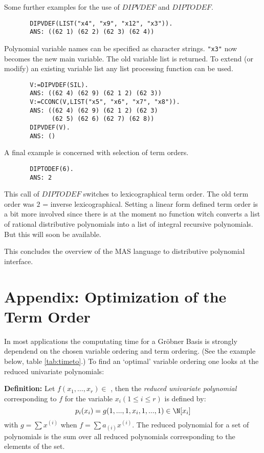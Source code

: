 Some further examples for the use of 
$DIPVDEF$ and $DIPTODEF$.
\begin{verbatim}
       DIPVDEF(LIST("x4", "x9", "x12", "x3")).
       ANS: ((62 1) (62 2) (62 3) (62 4)) 
\end{verbatim}
Polynomial variable names can be specified as   
character strings.
\verb/"x3"/ now becomes the new main variable.
The old variable list is returned.
To extend (or modify) an existing variable list 
any list processing function can be used. 
\begin{verbatim}
       V:=DIPVDEF(SIL).
       ANS: ((62 4) (62 9) (62 1 2) (62 3)) 
       V:=CCONC(V,LIST("x5", "x6", "x7", "x8")).
       ANS: ((62 4) (62 9) (62 1 2) (62 3) 
             (62 5) (62 6) (62 7) (62 8)) 
       DIPVDEF(V).
       ANS: () 
\end{verbatim}

A final example is concerned with 
selection of term orders.
\begin{verbatim}
       DIPTODEF(6).
       ANS: 2 
\end{verbatim}
This call of $DIPTODEF$ switches to lexicographical term order.
The old term order was $2$ = inverse lexicographical.
Setting a linear form defined term order 
is a bit more involved since there is at the moment 
no function witch converts a list of rational distributive 
polynomials into a list of integral recursive polynomials. 
But this will soon be available.

This concludes the overview of the MAS language 
to distributive polynomial interface.


\section{Appendix: Optimization of the Term Order} %

\label{sec:topt}
In most applications the computating time for a 
Gr\"obner Basis is strongly dependend
on the chosen variable ordering and term ordering.
(See the example below, table \ref{tab:timeto}.)
To find an `optimal' variable ordering one looks
at the reduced univariate polynomials:

{\bf Definition:} 
Let $f(x_1,\ldots,x_r) \in$ \R, then the
{\em reduced univariate polynomial} corresponding to $f$
for the variable $x_i ( 1 \leq i \leq r )$
is defined by:
\begin{displaymath}
     p_i (x_i) = g(1,...,1,x_i,1,...,1) \in \N \lbrack x_i \rbrack
\end{displaymath}
with $g = \sum x^{(i)}$ when $f = \sum a_{(i)} x^{(i)}$.
The reduced polynomial for a set of
polynomials is the sum over all
reduced polynomials
corresponding to the elements of the set.

